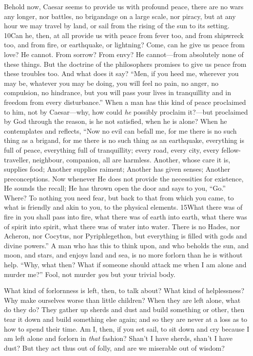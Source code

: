 Behold now, Caesar seems to provide us with profound peace, there are no wars any longer, nor battles, no brigandage on a large scale, nor piracy, but at any hour we may travel by land, or sail from the rising of the sun to its setting. 10Can he, then, at all provide us with peace from fever too, and from shipwreck too, and from fire, or earthquake, or lightning? Come, can he give us peace from love? He cannot. From sorrow? From envy? He cannot—from absolutely none of these things. But the doctrine of the philosophers promises to give us peace from these troubles too. And what does it say? ``Men, if you heed me, wherever you may be, whatever you may be doing, you will feel no pain, no anger, no compulsion, no hindrance, but you will pass your lives in tranquillity and in freedom from every disturbance.'' When a man has this kind of peace proclaimed to him, not by Caesar—why, how could \emph{he} possibly proclaim it?—but proclaimed by God through the reason, is he not satisfied, when he is alone? When he contemplates and reflects, ``Now no evil can befall me, for me there is no such thing as a brigand, for me there is no such thing as an earthquake, everything is full of peace, everything full of tranquillity; every road, every city, every fellow-traveller, neighbour, companion, all are harmless. Another, whose care it is, supplies food; Another supplies raiment; Another has given senses; Another preconceptions. Now whenever He does not provide the necessities for existence, He sounds the recall; He has thrown open the door and says to you, ``Go.'' Where? To nothing you need fear, but back to that from which you came, to what is friendly and akin to you, to the physical elements. 15What there was of fire in you shall pass into fire, what there was of earth into earth, what there was of spirit into spirit, what there was of water into water. There is no Hades, nor Acheron, nor Cocytus, nor Pyriphlegethon, but everything is filled with gods and divine powers.'' A man who has this to think upon, and who beholds the sun, and moon, and stars, and enjoys land and sea, is no more forlorn than he is without help. ``Why, what then? What if someone should attack me when I am alone and murder me?'' Fool, not murder \emph{you} but your trivial body.

What kind of forlornness is left, then, to talk about? What kind of helplessness? Why make ourselves worse than little children? When they are left alone, what do they do? They gather up sherds and dust and build something or other, then tear it down and build something else again; and so they are never at a loss as to how to spend their time. Am I, then, if you set sail, to sit down and cry because I am left alone and forlorn in \emph{that} fashion? Shan't I have sherds, shan't I have dust? But they act thus out of folly, and are we miserable out of wisdom?

